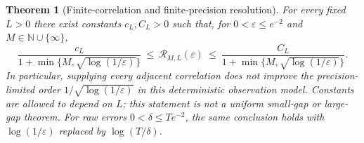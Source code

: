 \documentclass[11pt]{article}
\newtheorem{theorem}{Theorem}[section]
\theoremstyle{definition}
\theoremstyle{remark}
\numberwithin{equation}{section}
\begin{document}
\begin{theorem}[Finite-correlation and finite-precision resolution]
\label{restore:noisy}
For every fixed $L>0$ there exist constants $c_L,C_L>0$ such that,
for $0<\varepsilon\le e^{-2}$ and $M\in\mathbb N\cup\{\infty\}$,
\[
 \frac{c_L}{1+\min\{M,\sqrt{\log(1/\varepsilon)}\}}
 \ \le\ \mathcal R_{M,L}(\varepsilon)
 \ \le\
 \frac{C_L}{1+\min\{M,\sqrt{\log(1/\varepsilon)}\}}.
\]
In particular, supplying every adjacent correlation does not improve
the precision-limited order $1/\sqrt{\log(1/\varepsilon)}$ in this
deterministic observation model.  Constants are allowed to depend on
$L$; this statement is not a uniform small-gap or large-gap theorem.
For raw errors $0<\delta\le Te^{-2}$, the same conclusion holds with
$\log(1/\varepsilon)$ replaced by $\log(T/\delta)$.
\end{theorem}
\end{document}
